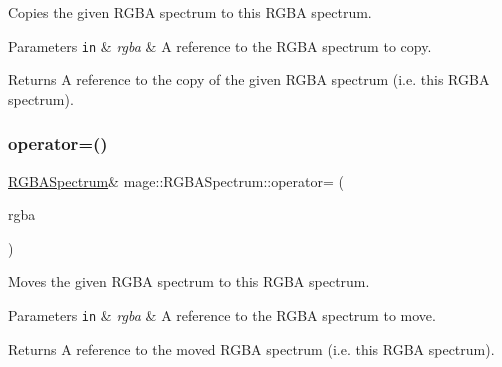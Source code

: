 Copies the given R\+G\+BA spectrum to this R\+G\+BA spectrum.


\begin{DoxyParams}[1]{Parameters}
\mbox{\tt in}  & {\em rgba} & A reference to the R\+G\+BA spectrum to copy. \\
\hline
\end{DoxyParams}
\begin{DoxyReturn}{Returns}
A reference to the copy of the given R\+G\+BA spectrum (i.\+e. this R\+G\+BA spectrum). 
\end{DoxyReturn}
\hypertarget{structmage_1_1_r_g_b_a_spectrum_ae23c094db4110804cf4b3bc0a00af131}{}\label{structmage_1_1_r_g_b_a_spectrum_ae23c094db4110804cf4b3bc0a00af131} 
\subsubsection{\texorpdfstring{operator=()}{operator=()}\hspace{0.1cm}{\footnotesize\ttfamily [2/2]}}
{\footnotesize\ttfamily \hyperlink{structmage_1_1_r_g_b_a_spectrum}{R\+G\+B\+A\+Spectrum}\& mage\+::\+R\+G\+B\+A\+Spectrum\+::operator= (\begin{DoxyParamCaption}\item[{\hyperlink{structmage_1_1_r_g_b_a_spectrum}{R\+G\+B\+A\+Spectrum} \&\&}]{rgba }\end{DoxyParamCaption})\hspace{0.3cm}{\ttfamily [default]}}

Moves the given R\+G\+BA spectrum to this R\+G\+BA spectrum.


\begin{DoxyParams}[1]{Parameters}
\mbox{\tt in}  & {\em rgba} & A reference to the R\+G\+BA spectrum to move. \\
\hline
\end{DoxyParams}
\begin{DoxyReturn}{Returns}
A reference to the moved R\+G\+BA spectrum (i.\+e. this R\+G\+BA spectrum). 
\end{DoxyReturn}
